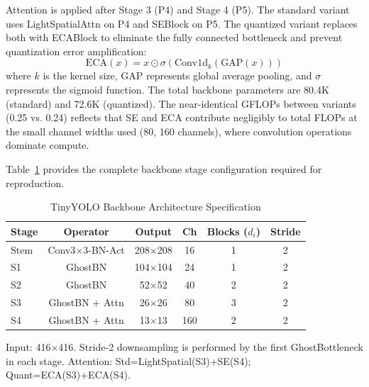 \documentclass[conference]{IEEEtran}
\begin{document}
Attention is applied after Stage 3 (P4) and Stage 4 (P5). The standard variant uses LightSpatialAttn on P4 and SEBlock on P5. The quantized variant replaces both with ECABlock to eliminate the fully connected bottleneck and prevent quantization error amplification:
\begin{equation}
\text{ECA}(x) = x \odot \sigma(\text{Conv1d}_{k}(\text{GAP}(x)))
\end{equation}
where $k$ is the kernel size, $\text{GAP}$ represents global average pooling, and $\sigma$ represents the sigmoid function. The total backbone parameters are 80.4K (standard) and 72.6K (quantized). The near-identical GFLOPs between variants (0.25 vs. 0.24) reflects that SE and ECA contribute negligibly to total FLOPs at the small channel widths used (80, 160 channels), where convolution operations dominate compute.

Table~\ref{tab:arch_spec} provides the complete backbone stage configuration required for reproduction.

\begin{table}[h]
\centering
\caption{TinyYOLO Backbone Architecture Specification}
\label{tab:arch_spec}
\setlength{\tabcolsep}{3pt}
\begin{tabular}{lccccc}
\toprule
Stage & Operator & Output & Ch & Blocks ($d_i$) & Stride \\
\midrule
Stem & Conv3$\times$3-BN-Act & 208$\times$208 & 16 & 1 & 2 \\
S1 & GhostBN & 104$\times$104 & 24 & 1 & 2 \\
S2 & GhostBN & 52$\times$52 & 40 & 2 & 2 \\
S3 & GhostBN + Attn & 26$\times$26 & 80 & 3 & 2 \\
S4 & GhostBN + Attn & 13$\times$13 & 160 & 2 & 2 \\
\bottomrule
\end{tabular}
\vskip 2pt
\begin{flushleft}
\scriptsize Input: 416$\times$416. Stride-2 downsampling is performed by the first GhostBottleneck in each stage. Attention: Std=LightSpatial(S3)+SE(S4); Quant=ECA(S3)+ECA(S4).
\end{flushleft}
\end{table}
\end{document}
